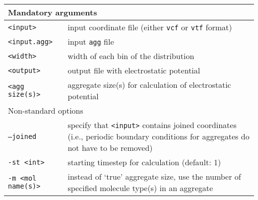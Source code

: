 \noindent
\begin{longtable}{p{}p{}}
  \toprule
  \multicolumn{2}{l}{Mandatory arguments} \\
  \midrule
  \texttt{<input>} & input coordinate file (either \texttt{vcf} or
    \texttt{vtf} format) \\
  \texttt{<input.agg>} & input \texttt{agg} file \\
  \texttt{<width>} & width of each bin of the distribution \\
  \texttt{<output>} & output file with electrostatic potential \\
  \texttt{<agg size(s)>} & aggregate size(s) for calculation of
  electrostatic potential \\
  \toprule
  \multicolumn{2}{l}{Non-standard options} \\
  \midrule
  \texttt{--joined} & specify that \texttt{<input>} contains joined
    coordinates (i.e., periodic boundary conditions for aggregates do not
    have to be removed) \\
  \texttt{-st <int>} & starting timestep for calculation (default: 1) \\
  \texttt{-m <mol name(s)>} & instead of `true' aggregate size, use the number
    of specified molecule type(s) in an aggregate \\
  \bottomrule
\end{longtable}
